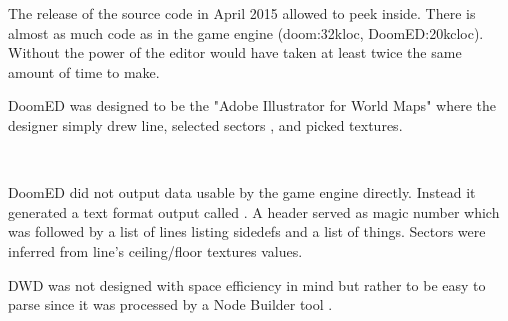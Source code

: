 The release of the source code in April 2015 allowed to peek inside. There is almost as much code as in the game engine (doom:32kloc, DoomED:20kcloc). Without the power of \NeXT the editor would have taken at least twice the same amount of time to make.



\par
DoomED was designed to be the "Adobe Illustrator for World Maps" where the designer simply drew line, selected sectors , and picked textures.\\
\par
\vspace{10pt}
\\
\par
{}


\vspace{-4mm}
DoomED did not output data usable by the game engine directly. Instead it generated a text format output called . A header served as magic number which was followed by a list of lines listing sidedefs and a list of things. Sectors were inferred from line's ceiling/floor textures values.\\
\par
{}
\par
DWD was not designed with space efficiency in mind but rather to be easy to parse since it was processed by a Node Builder tool .\\
\par
{}
\par

\pagebreak





